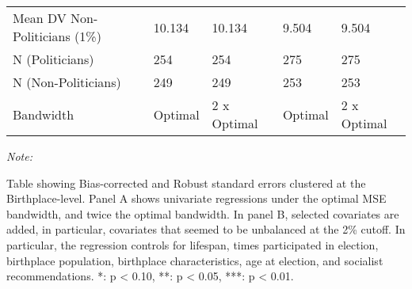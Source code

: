 \begin{table}[!h]
\begin{threeparttable}
\begin{tabular}[t]{lllll}
\hspace{1em}Mean DV Non-Politicians (1\%) & 10.134 & 10.134 & 9.504 & 9.504\\
\hspace{1em}N (Politicians) & 254 & 254 & 275 & 275\\
\hspace{1em}N (Non-Politicians) & 249 & 249 & 253 & 253\\
\hspace{1em}Bandwidth & Optimal & 2 x Optimal & Optimal & 2 x Optimal\\
\bottomrule
\end{tabular}
\begin{tablenotes}[para]
\item \textit{Note: } 
\item Table showing Bias-corrected and Robust standard errors clustered at the Birthplace-level. Panel A shows univariate regressions under the optimal MSE bandwidth, and twice the optimal bandwidth. In panel B, selected covariates are added, in particular, covariates that seemed to be unbalanced at the 2\% cutoff. In particular, the regression controls for lifespan, times participated in election, birthplace population, birthplace characteristics, age at election, and socialist recommendations. *: p < 0.10, **: p < 0.05, ***: p < 0.01.
\end{tablenotes}
\end{threeparttable}
\end{table}
